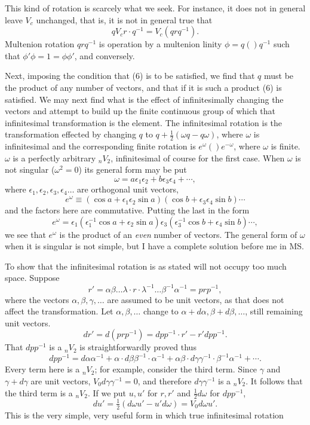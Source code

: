 \documentclass[11pt]{article}
\begin{document}
This kind of rotation is scarcely what we seek. For instance, it does not in general leave $V_c$ unchanged, that is, it is not in general true that
\begin{equation}qV_cr\cdot q^{-1}=V_c(qrq^{-1}).\tag{6}\end{equation}
Multenion rotation $qrq^{-1}$ is operation by a multenion linity $\phi=q()q^{-1}$ such that $\phi'\phi=1=\phi\phi'$, and conversely.

\indent Next, imposing the condition that (6) is to be satisfied, we find that $q$ must be the product of any number of vectors, and that if it is such a product (6) is satisfied. We may next find what is the effect of infinitesimally changing the vectors and attempt to build up the finite continuous group of which that infinitesimal transformation is the element. The infinitesimal rotation is the transformation effected by changing $q$ to $q+\tfrac12(\omega q-q\omega)$, where $\omega$ is infinitesimal and the corresponding finite rotation is $e^\omega()e^{-\omega}$, where $\omega$ is finite. $\omega$ is a perfectly arbitrary ${}_nV_2$, infinitesimal of course for the first case. When $\omega$ is not singular ($\omega^2=0$) its general form may be put
\[\omega=a\epsilon_1\epsilon_2+b\epsilon_3\epsilon_4+\cdots,\]
where $\epsilon_1,\epsilon_2,\epsilon_3,\epsilon_4\ldots$ are orthogonal unit vectors,
\[e^\omega\equiv(\cos a+\epsilon_1\epsilon_2\sin a)(\cos b+\epsilon_3\epsilon_4\sin b)\cdots\]
and the factors here are commutative. Putting the last in the form
\[e^\omega=\epsilon_1(\epsilon_1^{-1}\cos a+\epsilon_2\sin a)\epsilon_3(\epsilon_3^{-1}\cos b+\epsilon_4\sin b)\cdots,\]
we see that $e^\omega$ is the product of an \emph{even} number of vectors. The general form of $\omega$ when it is singular is not simple, but I have a complete solution before me in MS.

\indent To show that the infinitesimal rotation is as stated will not occupy too much space. Suppose
\[r'=\alpha\beta\ldots\lambda\cdot r\cdot\lambda^{-1}\ldots\beta^{-1}\alpha^{-1}=prp^{-1},\]
where the vectors $\alpha,\beta,\gamma,\ldots$ are assumed to be unit vectors, as that does not affect the transformation. Let $\alpha,\beta,\ldots$ change to $\alpha+d\alpha,\beta+d\beta,\ldots$, still remaining unit vectors.
\[dr'=d(prp^{-1})=dpp^{-1}\cdot r'-r'dpp^{-1}.\]
That $dpp^{-1}$ is a ${}_nV_2$ is straightforwardly proved thus
\[dpp^{-1}=d\alpha\alpha^{-1}+\alpha\cdot d\beta\beta^{-1}\cdot\alpha^{-1}+\alpha\beta\cdot d\gamma\gamma^{-1}\cdot\beta^{-1}\alpha^{-1}+\cdots.\]
Every term here is a ${}_nV_2$; for example, consider the third term. Since $\gamma$ and $\gamma+d\gamma$ are unit vectors, $V_0d\gamma\gamma^{-1}=0$, and therefore $d\gamma\gamma^{-1}$ is a ${}_nV_2$. It follows that the third term is a ${}_nV_2$. If we put $u,u'$ for $r,r'$ and $\tfrac12d\omega$ for $dpp^{-1}$,
\[du'=\tfrac12(d\omega u'-u'd\omega)=V_0d\omega u'.\]
This is the very simple, very useful form in which true infinitesimal rotation
\end{document}
